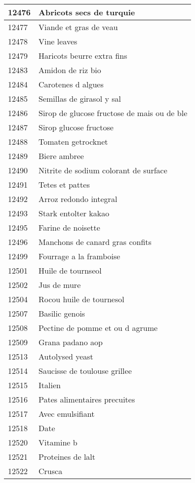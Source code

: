 \begin{longtable}{|l|l|}
12476 & Abricots secs de turquie \\ \hline 
12477 & Viande et gras de veau \\ \hline 
12478 & Vine leaves \\ \hline 
12479 & Haricots beurre extra fins \\ \hline 
12483 & Amidon de riz bio \\ \hline 
12484 & Carotenes d algues \\ \hline 
12485 & Semillas de girasol y sal \\ \hline 
12486 & Sirop de glucose fructose de mais ou de ble \\ \hline 
12487 & Sirop glucose fructose \\ \hline 
12488 & Tomaten getrocknet \\ \hline 
12489 & Biere ambree \\ \hline 
12490 & Nitrite de sodium colorant de surface \\ \hline 
12491 & Tetes et pattes \\ \hline 
12492 & Arroz redondo integral \\ \hline 
12493 & Stark entolter kakao \\ \hline 
12495 & Farine de noisette \\ \hline 
12496 & Manchons de canard gras confits \\ \hline 
12499 & Fourrage a la framboise \\ \hline 
12501 & Huile de tournseol \\ \hline 
12502 & Jus de mure \\ \hline 
12504 & Rocou huile de tournesol \\ \hline 
12507 & Basilic genois \\ \hline 
12508 & Pectine de pomme et ou d agrume \\ \hline 
12509 & Grana padano aop \\ \hline 
12513 & Autolysed yeast \\ \hline 
12514 & Saucisse de toulouse grillee \\ \hline 
12515 & Italien \\ \hline 
12516 & Pates alimentaires precuites \\ \hline 
12517 & Avec emulsifiant \\ \hline 
12518 & Date \\ \hline 
12520 & Vitamine b \\ \hline 
12521 & Proteines de lalt \\ \hline 
12522 & Crusca \\ \hline 

\end{longtable}

